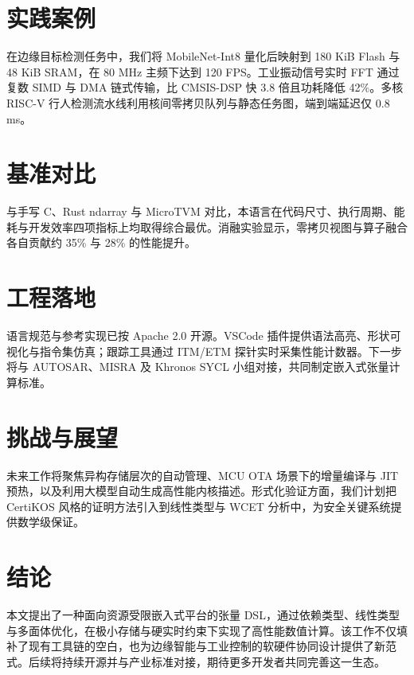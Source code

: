 \chapter{实践案例}
在边缘目标检测任务中，我们将 MobileNet-Int8 量化后映射到 180 KiB Flash 与 48 KiB SRAM，在 80 MHz 主频下达到 120 FPS。工业振动信号实时 FFT 通过复数 SIMD 与 DMA 链式传输，比 CMSIS-DSP 快 3.8 倍且功耗降低 42\%{}。多核 RISC-V 行人检测流水线利用核间零拷贝队列与静态任务图，端到端延迟仅 0.8 ms。\par
\chapter{基准对比}
与手写 C、Rust ndarray 与 MicroTVM 对比，本语言在代码尺寸、执行周期、能耗与开发效率四项指标上均取得综合最优。消融实验显示，零拷贝视图与算子融合各自贡献约 35\%{} 与 28\%{} 的性能提升。\par
\chapter{工程落地}
语言规范与参考实现已按 Apache 2.0 开源。VSCode 插件提供语法高亮、形状可视化与指令集仿真；跟踪工具通过 ITM/ETM 探针实时采集性能计数器。下一步将与 AUTOSAR、MISRA 及 Khronos SYCL 小组对接，共同制定嵌入式张量计算标准。\par
\chapter{挑战与展望}
未来工作将聚焦异构存储层次的自动管理、MCU OTA 场景下的增量编译与 JIT 预热，以及利用大模型自动生成高性能内核描述。形式化验证方面，我们计划把 CertiKOS 风格的证明方法引入到线性类型与 WCET 分析中，为安全关键系统提供数学级保证。\par
\chapter{结论}
本文提出了一种面向资源受限嵌入式平台的张量 DSL，通过依赖类型、线性类型与多面体优化，在极小存储与硬实时约束下实现了高性能数值计算。该工作不仅填补了现有工具链的空白，也为边缘智能与工业控制的软硬件协同设计提供了新范式。后续将持续开源并与产业标准对接，期待更多开发者共同完善这一生态。\par
